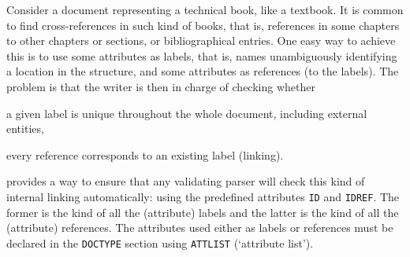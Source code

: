 Consider a document representing a technical book, like a textbook. It
is common to find cross\hyp{}references in such kind of books, that
is, references in some chapters to other chapters or sections, or
bibliographical entries. One easy way to achieve this is to use some
attributes as labels, that is, names unambiguously identifying a
location in the structure, and some attributes as references (to the
labels). The problem is that the writer is then in charge of checking
whether
\begin{itemize*}

  \item a given label is unique throughout the whole document,
        including external entities,

  \item every reference corresponds to an existing label (linking).

\end{itemize*}
\label{xml_intro:ATTLIST}
\XML provides a way to ensure that any validating parser will check
this kind of internal linking automatically: using the predefined
attributes \texttt{ID} and \texttt{IDREF}. The former is the kind of
all the (attribute) labels and the latter is the kind of all the
(attribute) references. The attributes used either as labels or
references must be declared in the \texttt{DOCTYPE} section using
\texttt{ATTLIST} (`attribute list').

